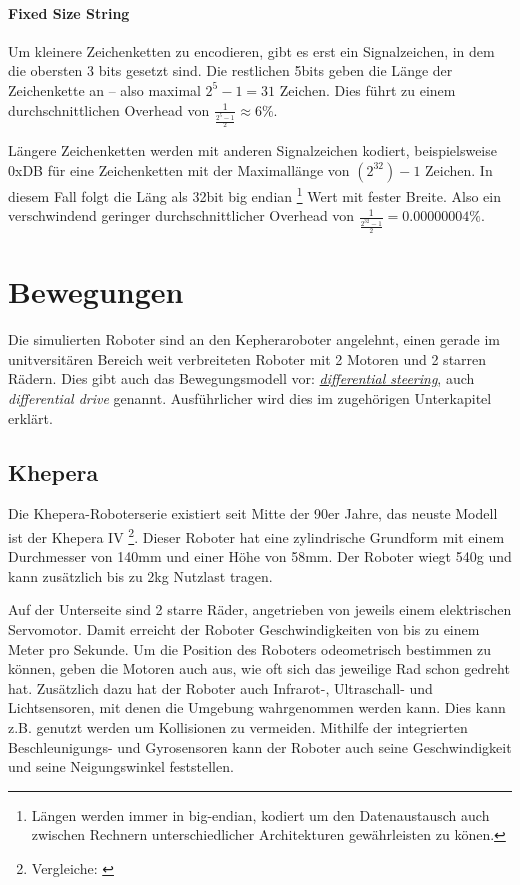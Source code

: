 \paragraph{Fixed Size String} Um kleinere Zeichenketten zu encodieren, gibt es erst ein Signalzeichen,
in dem die obersten 3 bits gesetzt sind. Die restlichen 5bits geben die L{\"{a}}nge der Zeichenkette an --
also maximal $2^5 - 1 = 31$ Zeichen. Dies f{\"{u}}hrt zu einem durchschnittlichen Overhead von
$ \frac{1}{\frac{2^5-1}{2}} \approx 6\% $.

L{\"{a}}ngere Zeichenketten werden mit anderen Signalzeichen kodiert, beispielsweise 0xDB f{\"{u}}r eine Zeichenketten mit der Maximall{\"{a}}nge von $(2^{32})-1$ Zeichen.
In diesem Fall folgt die L{\"{a}}ng als 32bit big endian
\footnote{L{\"{a}}ngen werden immer in big-endian, kodiert um den Datenaustausch auch zwischen Rechnern unterschiedlicher Architekturen gew{\"{a}}hrleisten zu k{\"{o}}nen.}
Wert mit fester Breite. Also ein verschwindend geringer durchschnittlicher Overhead von $ \frac{1}{\frac{2^{32}-1}{2}} = 0.00000004\% $.

\clearpage
\section{Bewegungen}
Die simulierten Roboter sind an den Kepheraroboter angelehnt, einen gerade im unitversit{\"{a}}ren Bereich weit verbreiteten Roboter mit 2 Motoren und 2 starren R{\"{a}}dern.
Dies gibt auch das Bewegungsmodell vor: \hyperref[diffs]{\textit{differential steering}}, auch \textit{differential drive} genannt. Ausf{\"{u}}hrlicher wird dies im zugeh{\"{o}}rigen Unterkapitel erkl{\"{a}}rt.

\subsection{Khepera}\label{khepera}
Die Khepera-Roboterserie existiert seit Mitte der 90er Jahre, das neuste Modell ist der Khepera IV
\footnote{Vergleiche: \cite{Soares2016}}.
Dieser Roboter hat eine zylindrische Grundform mit einem Durchmesser von 140mm und einer
H{\"{o}}he von 58mm. Der Roboter wiegt 540g und kann zus{\"{a}}tzlich bis zu 2kg Nutzlast tragen.

Auf der Unterseite sind 2 starre R{\"{a}}der, angetrieben von jeweils einem elektrischen Servomotor.
Damit erreicht der Roboter Geschwindigkeiten von bis zu einem Meter pro Sekunde. Um die Position des
Roboters odeometrisch bestimmen zu k{\"{o}}nnen, geben die Motoren auch aus, wie oft sich das
jeweilige Rad schon gedreht hat. Zus{\"{a}}tzlich dazu hat der Roboter auch Infrarot-, Ultraschall-
und Lichtsensoren, mit denen die Umgebung wahrgenommen werden kann. Dies kann z.B. genutzt werden
um Kollisionen zu vermeiden. Mithilfe der integrierten Beschleunigungs- und Gyrosensoren kann
der Roboter auch seine Geschwindigkeit und seine Neigungswinkel feststellen.

